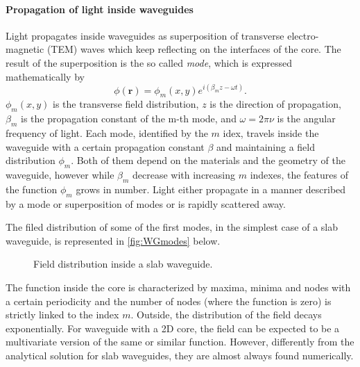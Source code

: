 \paragraph{Propagation of light inside waveguides\\}
\noindent Light propagates inside waveguides as superposition of transverse electro-magnetic (TEM) waves which keep reflecting on the interfaces of the core.
The result of the superposition is the so called \textit{mode}, which is expressed mathematically by
\begin{equation}
	\phi(\textbf{r}) = \phi_m\left( x, y \right) e^{i\left( \beta_m z - \omega t \right)}.
	\label{eq:mode_propagation}
\end{equation}
$\phi_m\left( x, y \right)$ is the transverse field distribution, $z$ is the direction of propagation, $\beta_m$ is the propagation constant of the m-th mode, and $\omega=2\pi \nu$ is the angular frequency of light.
Each mode, identified by the $m$ idex, travels inside the waveguide with a certain propagation constant $\beta$ and maintaining a field distribution $\phi_m$.
Both of them depend on the materials and the geometry of the waveguide, however while $\beta_m$ decrease with increasing $m$ indexes, the features of the function $\phi_m$ grows in number.
Light either propagate in a manner described by a mode or superposition of modes or is rapidly scattered away.

The filed distribution of some of the first modes, in the simplest case of a slab waveguide, is represented in \autoref{fig:WGmodes} below.
\begin{figure}[ht]
	\centering
	
	\caption{Field distribution inside a slab waveguide.}
	\label{fig:WGmodes}
\end{figure}
The function inside the core is characterized by maxima, minima and nodes with a certain periodicity and the number of nodes (where the function is zero) is strictly linked to the index $m$.
Outside, the distribution of the field decays exponentially.
For waveguide with a 2D core, the field can be expected to be a multivariate version of the same or similar function.
However, differently from the analytical solution for slab waveguides, they are almost always found numerically.

